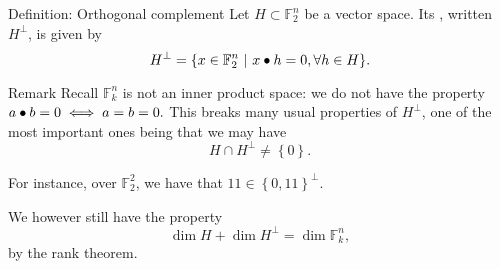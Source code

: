\documentclass[a4paper]{article}
\begin{document}
\begin{parag}{Definition: Orthogonal complement}
   Let $H \subset \mathbb{F}_2^n$ be a vector space. Its , written $H^\perp$, is given by
   \[H^\perp = \left\{x \in \mathbb{F}_2^n \suchthat x \dotprod h = 0, \forall h \in H\right\}.\]

   \begin{subparag}{Remark}
       Recall $\mathbb{F}_k^n$ is not an inner product space: we do not have the property $a \bullet b = 0 \iff a = b = 0.$ This breaks many usual properties of $H^\perp$, one of the most important ones being that we may have
       \[H \cap H^\perp \neq \left\{0\right\}.\]

       For instance, over $\mathbb{F}_2^2$, we have that $11 \in \left\{0, 11\right\}^{\perp}$.

       We however still have the property
       \[\dim H + \dim H^\perp = \dim \mathbb{F}_k^n,\]
       by the rank theorem.
   \end{subparag}
\end{parag}
\end{document}
